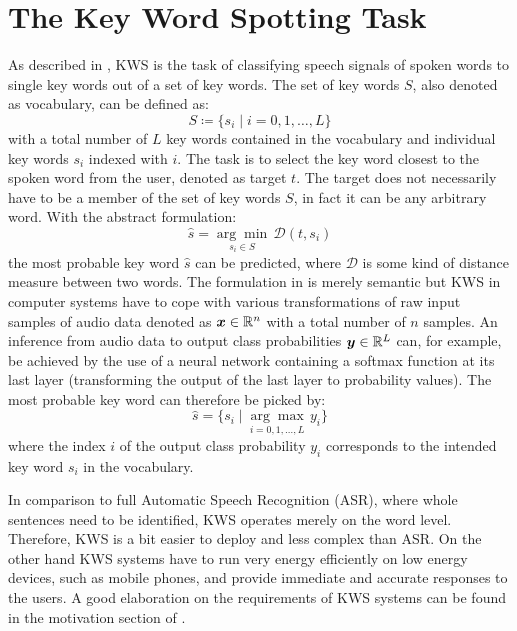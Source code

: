 
\section{The Key Word Spotting Task}\label{sec:intro_kws}
As described in , KWS is the task of classifying speech signals of spoken words to single key words out of a set of key words.
The set of key words $S$, also denoted as vocabulary, can be defined as:
\begin{equation}\label{eq:intro_kws_dict}
	S \coloneqq \{s_i \mid i = 0, 1, \dots, L\}
\end{equation}
with a total number of $L$ key words contained in the vocabulary and individual key words $s_i$ indexed with $i$.
The task is to select the key word closest to the spoken word from the user, denoted as target $t$.
The target does not necessarily have to be a member of the set of key words $S$, in fact it can be any arbitrary word.
With the abstract formulation:
\begin{equation}\label{eq:intro_kws_task}
	\hat{s} = \underset{s_i \in S}{\arg \min} \, \mathcal{D}(t, s_i)
\end{equation}
the most probable key word $\hat{s}$ can be predicted, where $\mathcal{D}$ is some kind of distance measure between two words.
The formulation in  is merely semantic but KWS in computer systems have to cope with various transformations of raw input samples of audio data denoted as $\bm{x} \in \mathbb{R}^n$ with a total number of $n$ samples.
An inference from audio data to output class probabilities $\bm{y} \in \mathbb{R}^L$ can, for example, be achieved by the use of a neural network containing a softmax function at its last layer (transforming the output of the last layer to probability values).
The most probable key word can therefore be picked by:
\begin{equation}\label{eq:intro_kws_class}
	\hat{s} = \{s_i \mid \underset{i = 0, 1, \dots, L}{\arg \max} \, y_i\}
\end{equation}
where the index $i$ of the output class probability $y_i$ corresponds to the intended key word $s_i$ in the vocabulary.

In comparison to full Automatic Speech Recognition (ASR), where whole sentences need to be identified, KWS operates merely on the word level.
Therefore, KWS is a bit easier to deploy and less complex than ASR.
On the other hand KWS systems have to run very energy efficiently on low energy devices, such as mobile phones, and provide immediate and accurate responses to the users.
A good elaboration on the requirements of KWS systems can be found in the motivation section of \cite{Warden2018}.